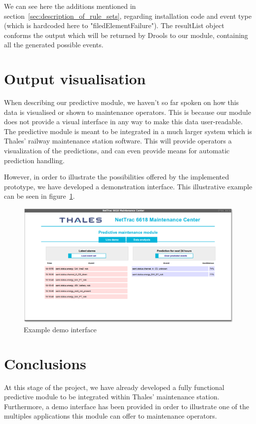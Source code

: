 We can see here the additions mentioned in section~\ref{sec:description_of_rule_sets}, regarding installation code and event type (which is hardcoded here to "filedElementFailure"). The resultList object conforms the output which will be returned by Drools to our module, containing all the generated possible events.

\section{Output visualisation}
When describing our predictive module, we haven't so far spoken on how this data is visualised or shown to maintenance operators. This is because our module does not provide a visual interface in any way to make this data user-readable. The predictive module is meant to be integrated in a much larger system which is Thales' railway maintenance station software. This will provide operators a visualization of the predictions, and can even provide means for automatic prediction handling.

However, in order to illustrate the possibilities offered by the implemented prototype, we have developed a demonstration interface. This illustrative example can be seen in figure~\ref{fig:demoExample}.

\begin{figure}[hbtp]
\includegraphics[width=\textwidth]{img/demoExample.png}
\caption{Example demo interface} \label{fig:demoExample}
\end{figure}

\clearpage

\section{Conclusions}
At this stage of the project, we have already developed a fully functional predictive module to be integrated within Thales' maintenance station. Furthermore, a demo interface has been provided in order to illustrate one of the multiples applications this module can offer to maintenance operators.

